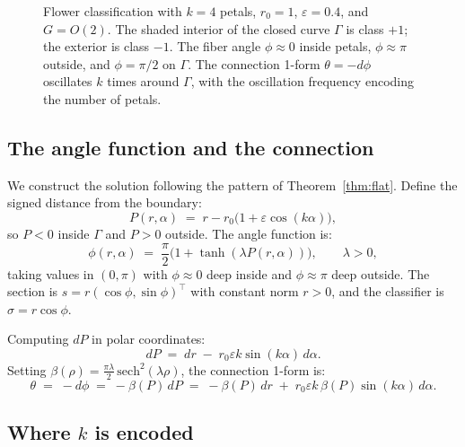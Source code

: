 \documentclass[11pt, a4paper]{article}
\theoremstyle{plain}
\theoremstyle{definition}
\newcommand{\Gam}{\Gamma}
\begin{document}
\begin{figure}[ht]
\caption{Flower classification with $k=4$ petals, $r_0=1$, $\varepsilon=0.4$,
and $G=O(2)$. The shaded interior of the closed curve $\Gam$ is class $+1$;
the exterior is class $-1$. The fiber angle $\phi \approx 0$ inside petals,
$\phi \approx \pi$ outside, and $\phi = \pi/2$ on $\Gam$. The connection
1-form $\theta = -d\phi$ oscillates $k$ times around $\Gam$, with the
oscillation frequency encoding the number of petals.}
\label{fig:flower}
\end{figure}

\subsection{The angle function and the connection}

We construct the solution following the pattern of Theorem~\ref{thm:flat}. Define the signed
distance from the boundary:
\[
  P(r,\alpha) \;=\; r - r_0\bigl(1 + \varepsilon\cos(k\alpha)\bigr),
\]
so $P < 0$ inside $\Gam$ and $P > 0$ outside. The angle function is:
\begin{equation}\label{eq:phi-flower}
  \phi(r,\alpha) \;=\; \frac{\pi}{2}\bigl(1 + \tanh(\lambda P(r,\alpha))\bigr),
  \qquad \lambda > 0,
\end{equation}
taking values in $(0,\pi)$ with $\phi \approx 0$ deep inside and $\phi \approx \pi$
deep outside. The section is $s = r(\cos\phi, \sin\phi)^\top$ with constant norm
$r > 0$, and the classifier is $\sigma = r\cos\phi$.

Computing $dP$ in polar coordinates:
\[
  dP \;=\; dr \;-\; r_0\varepsilon k\sin(k\alpha)\,d\alpha.
\]
Setting $\beta(\rho) = \frac{\pi\lambda}{2}\,\mathrm{sech}^2(\lambda\rho)$,
the connection 1-form is:
\begin{equation}\label{eq:conn-flower}
  \theta \;=\; -d\phi \;=\; -\beta(P)\,dP
  \;=\; -\beta(P)\,dr \;+\; r_0\varepsilon k\,\beta(P)\sin(k\alpha)\,d\alpha.
\end{equation}

\subsection{Where $k$ is encoded}
\end{document}
